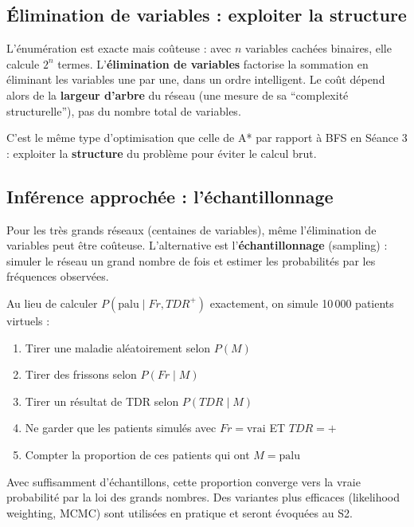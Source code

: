 \documentclass[11pt,a4paper]{article}
\begin{document}
\subsection{Élimination de variables : exploiter la structure}

L'énumération est exacte mais coûteuse : avec $n$ variables cachées binaires, elle calcule $2^n$ termes. L'\textbf{élimination de variables} factorise la sommation en éliminant les variables une par une, dans un ordre intelligent. Le coût dépend alors de la \textbf{largeur d'arbre} du réseau (une mesure de sa ``complexité structurelle''), pas du nombre total de variables.

C'est le même type d'optimisation que celle de A* par rapport à BFS en Séance 3 : exploiter la \textbf{structure} du problème pour éviter le calcul brut.

\subsection{Inférence approchée : l'échantillonnage}

Pour les très grands réseaux (centaines de variables), même l'élimination de variables peut être coûteuse. L'alternative est l'\textbf{échantillonnage} (sampling) : simuler le réseau un grand nombre de fois et estimer les probabilités par les fréquences observées.

\begin{exemplebox}
Au lieu de calculer $P(\text{palu} \mid Fr, TDR^+)$ exactement, on simule 10\,000 patients virtuels :
\begin{enumerate}
    \item Tirer une maladie aléatoirement selon $P(M)$
    \item Tirer des frissons selon $P(Fr \mid M)$
    \item Tirer un résultat de TDR selon $P(TDR \mid M)$
    \item Ne garder que les patients simulés avec $Fr = \text{vrai}$ ET $TDR = +$
    \item Compter la proportion de ces patients qui ont $M = \text{palu}$
\end{enumerate}

Avec suffisamment d'échantillons, cette proportion converge vers la vraie probabilité par la loi des grands nombres. Des variantes plus efficaces (likelihood weighting, MCMC) sont utilisées en pratique et seront évoquées au S2.
\end{exemplebox}
\end{document}
